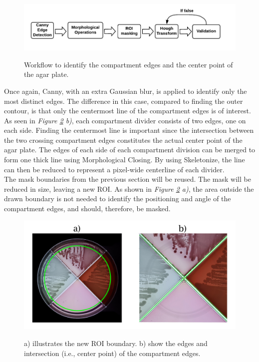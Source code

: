 \begin{figure}[H]
    \centering
     \includegraphics[width=0.9\linewidth]{figures/PDF/Identify compartment edges.pdf}\\
    \caption{Workflow to identify the compartment edges and the center point of the agar plate.}
    \label{fig:compartment edges flowchart}
\end{figure}

\noindent Once again, Canny, with an extra Gaussian blur, is applied to identify only the most distinct edges. The difference in this case, compared to finding the outer contour, is that only the centermost line of the compartment edges is of interest. As seen in \textit{Figure \ref{fig:compartment masking} b)}, each compartment divider consists of two edges, one on each side. Finding the centermost line is important since the intersection between the two crossing compartment edges constitutes the actual center point of the agar plate. The edges of each side of each compartment division can be merged to form one thick line using Morphological Closing. By using Skeletonize, the line can then be reduced to represent a pixel-wide centerline of each divider. \\

\noindent The mask boundaries from the previous section will be reused. The mask will be reduced in size, leaving a new ROI. As shown in \textit{Figure \ref{fig:compartment masking} a)}, the area outside the drawn boundary is not needed to identify the positioning and angle of the compartment edges, and should, therefore, be masked. \\


\begin{figure}[H]
    \centering
    \includegraphics[width=.8\linewidth]{figures/PDF/ROI_boundaries.pdf} \\
    \caption{a) illustrates the new ROI boundary. b) show the edges and intersection (i.e., center point) of the compartment edges.}
    \label{fig:compartment masking}
\end{figure}

